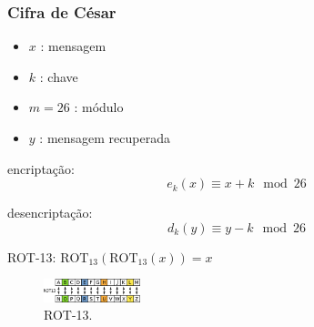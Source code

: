 \begin{frame}
\frametitle{Cifra de César}
\begin{itemize}
\item $x$ : mensagem
\item $k$ : chave
\item $m = 26$ : módulo
\item $y$ : mensagem recuperada
\end{itemize}

encriptação: 
\begin{equation}
e_k(x) \equiv x + k \mod 26
\end{equation}

desencriptação:
\begin{equation}
d_k(y) \equiv y - k \mod 26
\end{equation}

ROT-13: $\text{ROT}_{13}(\text{ROT}_{13}(x)) = x$

\begin{figure}[h]
\centering
\includegraphics[width=0.25\textwidth,height=0.15\textheight,keepaspectratio]{figures/rot13.png}
\caption{ROT-13.}
\label{fig-rot13}
\end{figure}
\end{frame}


